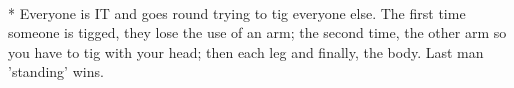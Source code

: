 \begin{minipage}{\textwidth}
\\*
Everyone is IT and goes round trying to tig everyone else. The first time someone is tigged, they lose the use of an arm; the second time, the other arm so you have to tig with your head; then each leg and finally, the body.  Last man 'standing' wins.
\end{minipage}    \vfill
